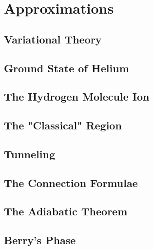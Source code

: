 \chapter{Approximations}
\section{Variational Theory}
\section{Ground State of Helium}
\section{The Hydrogen Molecule Ion}
\section{The "Classical" Region}
\section{Tunneling}
\section{The Connection Formulae}
\section{The Adiabatic Theorem}
\section{Berry's Phase}
